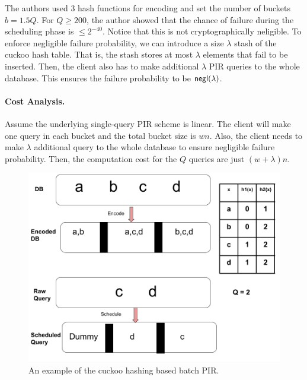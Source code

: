The authors used 3 hash functions for encoding and set the number of buckets $b = 1.5Q$. For $Q\geq 200$, the author showed that the chance of failure during
the scheduling phase is $\leq 2^{-40}$.
Notice that this is not cryptographically neligible. 
To enforce negligible failure probability, we can introduce a size $\lambda$ stash of the cuckoo hash table.
That is, the stash stores at most $\lambda$ elements that fail to be inserted. 
Then, the client also has to make additional $\lambda$ PIR queries to the whole database.
This ensures the failure probability to be ${\sf negl}(\lambda)$.

\paragraph{Cost Analysis.} 
Assume the underlying single-query PIR scheme is linear.
The client will make one query in each bucket and the total bucket size is $wn$.
Also, the client needs to make $\lambda$ additional query to the whole database to ensure negligible failure probability.
Then, the computation cost for the $Q$ queries are just $(w+\lambda)n$.

    
    
\begin{figure}
    \includegraphics[scale=0.45]{scribimg_batchpir.png}
    \caption{An example of the cuckoo hashing based batch PIR. \label{fig:sealpir}}
\end{figure}












